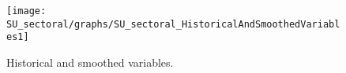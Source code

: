 
\begin{figure}[H]
\centering 
\texttt{[image: SU\_sectoral/graphs/SU\_sectoral\_HistoricalAndSmoothedVariables1]}
\caption{Historical and smoothed variables.}\label{Fig:HistoricalAndSmoothedVariables:1}
\end{figure}


